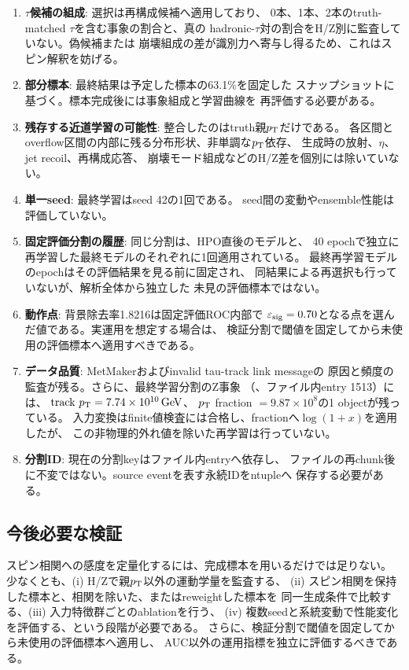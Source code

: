 \documentclass[xelatex,ja=standard,a4paper,10pt,twocolumn]{bxjsarticle}
\begin{document}
\begin{enumerate}
  \item \textbf{\(\tau\)候補の組成}: 選択は再構成候補へ適用しており、
    0本、1本、2本のtruth-matched \(\tau\)を含む事象の割合と、真の
    hadronic-\(\tau\)対の割合をH/Z別に監査していない。偽候補または
    崩壊組成の差が識別力へ寄与し得るため、これはスピン解釈を妨げる。
  \item \textbf{部分標本}: 最終結果は予定した標本の63.1\%を固定した
    スナップショットに基づく。標本完成後には事象組成と学習曲線を
    再評価する必要がある。
  \item \textbf{残存する近道学習の可能性}: 整合したのはtruth親\(p_{\mathrm{T}}\)だけである。
    各区間とoverflow区間の内部に残る分布形状、非単調な\(p_{\mathrm{T}}\)依存、
    生成時の放射、\(\eta\)、jet recoil、再構成応答、
    崩壊モード組成などのH/Z差を個別には除いていない。
  \item \textbf{単一seed}: 最終学習はseed 42の1回である。
    seed間の変動やensemble性能は評価していない。
  \item \textbf{固定評価分割の履歴}: 同じ分割は、HPO直後のモデルと、
    40 epochで独立に再学習した最終モデルのそれぞれに1回適用されている。
    最終再学習モデルのepochはその評価結果を見る前に固定され、
    同結果による再選択も行っていないが、解析全体から独立した
    未見の評価標本ではない。
  \item \textbf{動作点}: 背景除去率1.8216は固定評価ROC内部で
    \(\varepsilon_{\mathrm{sig}}=0.70\)となる点を選んだ値である。実運用を想定する場合は、
    検証分割で閾値を固定してから未使用の評価標本へ適用すべきである。
  \item \textbf{データ品質}: MetMakerおよびinvalid tau-track link messageの
    原因と頻度の監査が残る。さらに、最終学習分割のZ事象
    （、ファイル内entry 1513）には、
    \(\mathrm{track}\ \pt=\SI{7.74e10}{\GeV}\)、
    \(p_{\mathrm{T}}\) fraction \(=9.87\times10^8\)の1 objectが残っている。
    入力変換はfinite値検査には合格し、fractionへ\(\log(1+x)\)を適用したが、
    この非物理的外れ値を除いた再学習は行っていない。
  \item \textbf{分割ID}: 現在の分割keyはファイル内entryへ依存し、
    ファイルの再chunk後に不変ではない。source eventを表す永続IDをntupleへ
    保存する必要がある。
\end{enumerate}

\subsection{今後必要な検証}

スピン相関への感度を定量化するには、完成標本を用いるだけでは足りない。
少なくとも、(i) H/Zで親\(p_{\mathrm{T}}\)以外の運動学量を監査する、
(ii) スピン相関を保持した標本と、相関を除いた、またはreweightした標本を
同一生成条件で比較する、(iii) 入力特徴群ごとのablationを行う、
(iv) 複数seedと系統変動で性能変化を評価する、という段階が必要である。
さらに、検証分割で閾値を固定してから未使用の評価標本へ適用し、
AUC以外の運用指標を独立に評価するべきである。
\end{document}
